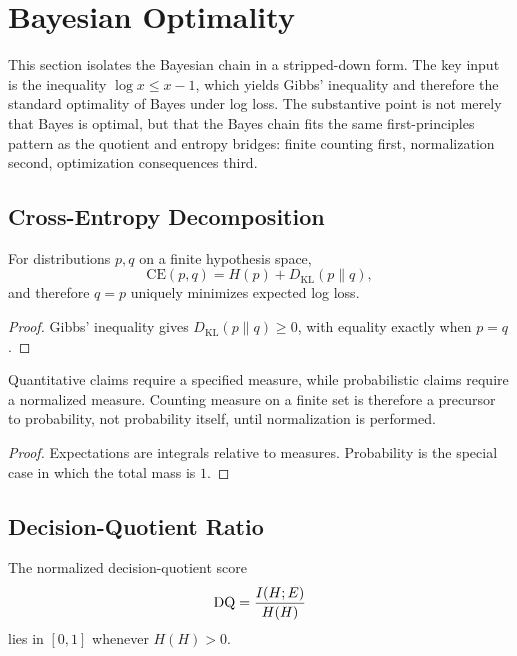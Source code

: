 \section{Bayesian Optimality}\label{sec:bayesian-optimality}

This section isolates the Bayesian chain in a stripped-down form. The key input is the inequality $\log x \le x - 1$, which yields Gibbs' inequality and therefore the standard optimality of Bayes under log loss. The substantive point is not merely that Bayes is optimal, but that the Bayes chain fits the same first-principles pattern as the quotient and entropy bridges: finite counting first, normalization second, optimization consequences third.

\subsection{Cross-Entropy Decomposition}

\begin{theorem}\label{thm:bayes-optimal}
For distributions $p,q$ on a finite hypothesis space,
\[
\mathrm{CE}(p,q)=H(p)+D_{\mathrm{KL}}(p\|q),
\]
and therefore $q=p$ uniquely minimizes expected log loss.
\end{theorem}

\begin{proof}
Gibbs' inequality gives $D_{\mathrm{KL}}(p\|q)\ge 0$, with equality exactly when $p=q$.
\end{proof}

\begin{theorem}\label{thm:measure-prerequisite}
Quantitative claims require a specified measure, while probabilistic claims require a normalized measure. Counting measure on a finite set is therefore a precursor to probability, not probability itself, until normalization is performed.
\end{theorem}

\begin{proof}
Expectations are integrals relative to measures. Probability is the special case in which the total mass is $1$.
\end{proof}

\subsection{Decision-Quotient Ratio}

\begin{proposition}\label{prop:dq-range}
The normalized decision-quotient score
\[
\mathrm{DQ} = \frac{I(H;E)}{H(H)}
\]
lies in $[0,1]$ whenever $H(H)>0$.
\end{proposition}


